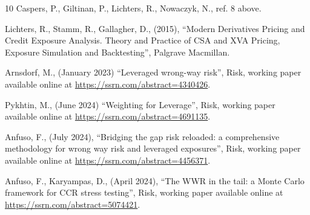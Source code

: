 \documentclass[11pt,a4paper,oneside]{article}
\begin{document}
\begin{thebibliography}{10}
  Caspers, P., Giltinan, P., Lichters, R., Nowaczyk, N., ref. 8 above.


  Lichters, R., Stamm, R., Gallagher, D.,
  (2015),
  ``Modern Derivatives Pricing and Credit Exposure Analysis. Theory and Practice of CSA and XVA Pricing, Exposure Simulation and Backtesting'',
  Palgrave Macmillan.

  Arnsdorf, M.,
  (January 2023)
  ``Leveraged wrong-way risk'',
  Risk,
  working paper available online at \url{https://ssrn.com/abstract=4340426}.
  

  Pykhtin, M.,
  (June 2024)
  ``Weighting for Leverage'',
  Risk,
  working paper available online at \url{https://ssrn.com/abstract=4691135}.

  Anfuso, F.,
  (July 2024),
  ``Bridging the gap risk reloaded: a comprehensive methodology for wrong way risk and leveraged exposures'',
  Risk,
  working paper available online at \url{https://ssrn.com/abstract=4456371}.

  Anfuso, F., Karyampas, D.,
  (April 2024),
  ``The WWR in the tail: a Monte Carlo framework for CCR stress testing'',
  Risk,
  working paper available online at \url{https://ssrn.com/abstract=5074421}.

\end{thebibliography}
\end{document}
